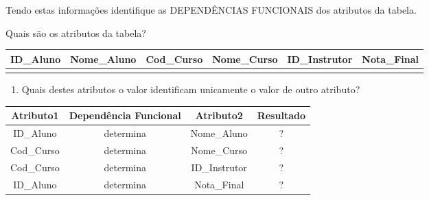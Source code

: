 \documentclass[
]{book}
\providecommand{\tightlist}{%
  \setlength{\itemsep}{0pt}\setlength{\parskip}{0pt}}
\begin{document}
Tendo estas informações identifique as DEPENDÊNCIAS FUNCIONAIS dos atributos da tabela.

Quais são os atributos da tabela?

\begin{longtable}[]{@{}
  >{\raggedright\arraybackslash}p{}
  >{\raggedright\arraybackslash}p{}
  >{\raggedright\arraybackslash}p{}
  >{\raggedright\arraybackslash}p{}
  >{\raggedright\arraybackslash}p{}
  >{\raggedright\arraybackslash}p{}@{}}
\toprule\noalign{}
\begin{minipage}[b]{\linewidth}\raggedright
ID\_Aluno
\end{minipage} & \begin{minipage}[b]{\linewidth}\raggedright
Nome\_Aluno
\end{minipage} & \begin{minipage}[b]{\linewidth}\raggedright
Cod\_Curso
\end{minipage} & \begin{minipage}[b]{\linewidth}\raggedright
Nome\_Curso
\end{minipage} & \begin{minipage}[b]{\linewidth}\raggedright
ID\_Instrutor
\end{minipage} & \begin{minipage}[b]{\linewidth}\raggedright
Nota\_Final
\end{minipage} \\
\midrule\noalign{}
\endhead
\bottomrule\noalign{}
\endlastfoot
& & & & & \\
\end{longtable}

\begin{enumerate}
\def\labelenumi{\arabic{enumi})}
\tightlist
\item
  Quais destes atributos o valor identificam unicamente o valor de outro atributo?
\end{enumerate}

\begin{longtable}[]{@{}cccc@{}}
\toprule\noalign{}
Atributo1 & Dependência Funcional & Atributo2 & Resultado \\
\midrule\noalign{}
\endhead
\bottomrule\noalign{}
\endlastfoot
ID\_Aluno & determina & Nome\_Aluno & ? \\
Cod\_Curso & determina & Nome\_Curso & ? \\
Cod\_Curso & determina & ID\_Instrutor & ? \\
ID\_Aluno & determina & Nota\_Final & ? \\
\end{longtable}
\end{document}
